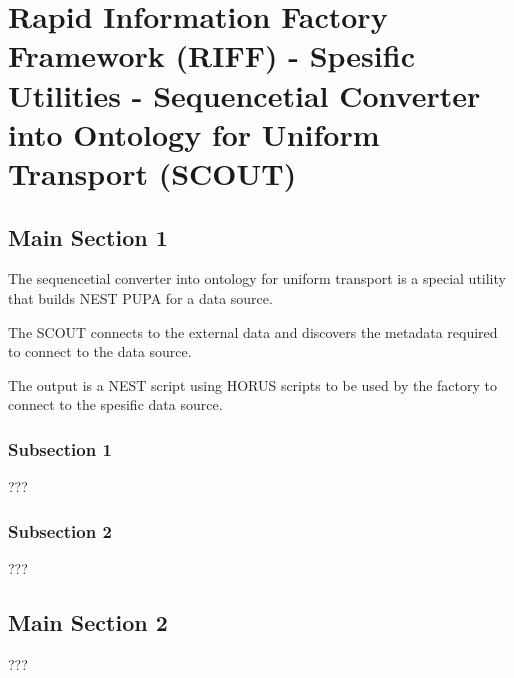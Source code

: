 
\chapter{Rapid Information Factory Framework (RIFF) - Spesific Utilities - Sequencetial Converter into Ontology for Uniform Transport (SCOUT)} %

\label{Chapter44} %



\section{Main Section 1}

The sequencetial converter into ontology for uniform transport is a special utility that builds NEST PUPA for a data source.

The SCOUT connects to the external data and discovers the metadata required to connect to the data source.

The output is a NEST script using HORUS scripts to be used by the factory to connect to the spesific data source.

\subsection{Subsection 1}

???


\subsection{Subsection 2}

???


\section{Main Section 2}

???
